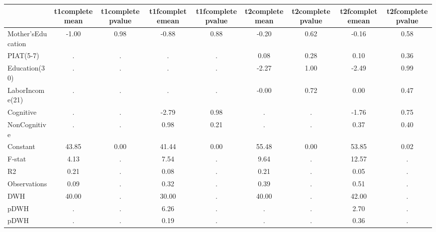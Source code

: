 \begin{table}[htbp]
\begin{tabular}{lcccccccc} \hline \hline
 & t1completemean  & t1completepvalue  & t1fcompletemean  & t1fcompletepvalue  & t2completemean  & t2completepvalue  & t2fcompletemean  & t2fcompletepvalue  \\  \hline 
Mother'sEducation &        -1.00 &         0.98 &        -0.88 &         0.88 &        -0.20 &         0.62 &        -0.16 &         0.58 \\  
PIAT(5-7) &            . &            . &            . &            . &         0.08 &         0.28 &         0.10 &         0.36 \\  
Education(30) &            . &            . &            . &            . &        -2.27 &         1.00 &        -2.49 &         0.99 \\  
LaborIncome(21) &            . &            . &            . &            . &        -0.00 &         0.72 &         0.00 &         0.47 \\  
Cognitive &            . &            . &        -2.79 &         0.98 &            . &            . &        -1.76 &         0.75 \\  
NonCognitive &            . &            . &         0.98 &         0.21 &            . &            . &         0.37 &         0.40 \\  
Constant &        43.85 &         0.00 &        41.44 &         0.00 &        55.48 &         0.00 &        53.85 &         0.02 \\  
F-stat &         4.13 &            . &         7.54 &            . &         9.64 &            . &        12.57 &            . \\  
R2 &         0.21 &            . &         0.08 &            . &         0.21 &            . &         0.05 &            . \\  
Observations &         0.09 &            . &         0.32 &            . &         0.39 &            . &         0.51 &            . \\  
DWH &        40.00 &            . &        30.00 &            . &        40.00 &            . &        42.00 &            . \\  
pDWH &            . &            . &         6.26 &            . &            . &            . &         2.70 &            . \\  
pDWH &            . &            . &         0.19 &            . &            . &            . &         0.36 &            . \\  
\hline \hline \end{tabular}
\end{table}
